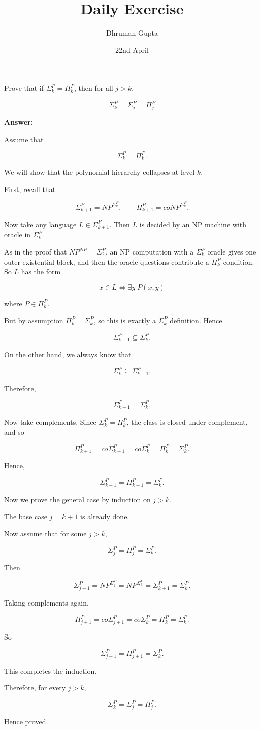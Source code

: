 \documentclass[11pt]{article}
\title{Daily Exercise}
\author{Dhruman Gupta}
\date{22nd April}
\begin{document}

Prove that if $\Sigma_k^P = \Pi_k^P$, then for all $j > k$,

\[
\Sigma_k^P = \Sigma_j^P = \Pi_j^P
\]

\textbf{Answer:}

Assume that

\[
\Sigma_k^P = \Pi_k^P.
\]

We will show that the polynomial hierarchy collapses at level $k$.

First, recall that

\[
\Sigma_{k+1}^P = NP^{\Sigma_k^P}, \qquad \Pi_{k+1}^P = coNP^{\Sigma_k^P}.
\]

Now take any language $L \in \Sigma_{k+1}^P$. Then $L$ is decided by an NP machine with oracle in $\Sigma_k^P$.

As in the proof that $NP^{NP} = \Sigma_2^P$, an NP computation with a $\Sigma_k^P$ oracle gives one outer existential block, and then the oracle questions contribute a $\Pi_k^P$ condition. So $L$ has the form

\[
x \in L \iff \exists y \; P(x,y)
\]

where $P \in \Pi_k^P$.

But by assumption $\Pi_k^P = \Sigma_k^P$, so this is exactly a $\Sigma_k^P$ definition. Hence

\[
\Sigma_{k+1}^P \subseteq \Sigma_k^P.
\]

On the other hand, we always know that

\[
\Sigma_k^P \subseteq \Sigma_{k+1}^P.
\]

Therefore,

\[
\Sigma_{k+1}^P = \Sigma_k^P.
\]

Now take complements. Since $\Sigma_k^P = \Pi_k^P$, the class is closed under complement, and so

\[
\Pi_{k+1}^P = co\Sigma_{k+1}^P = co\Sigma_k^P = \Pi_k^P = \Sigma_k^P.
\]

Hence,

\[
\Sigma_{k+1}^P = \Pi_{k+1}^P = \Sigma_k^P.
\]

Now we prove the general case by induction on $j > k$.

The base case $j = k+1$ is already done.

Now assume that for some $j > k$,

\[
\Sigma_j^P = \Pi_j^P = \Sigma_k^P.
\]

Then

\[
\Sigma_{j+1}^P = NP^{\Sigma_j^P} = NP^{\Sigma_k^P} = \Sigma_{k+1}^P = \Sigma_k^P.
\]

Taking complements again,

\[
\Pi_{j+1}^P = co\Sigma_{j+1}^P = co\Sigma_k^P = \Pi_k^P = \Sigma_k^P.
\]

So

\[
\Sigma_{j+1}^P = \Pi_{j+1}^P = \Sigma_k^P.
\]

This completes the induction.

Therefore, for every $j > k$,

\[
\Sigma_k^P = \Sigma_j^P = \Pi_j^P.
\]

Hence proved.
\end{document}
